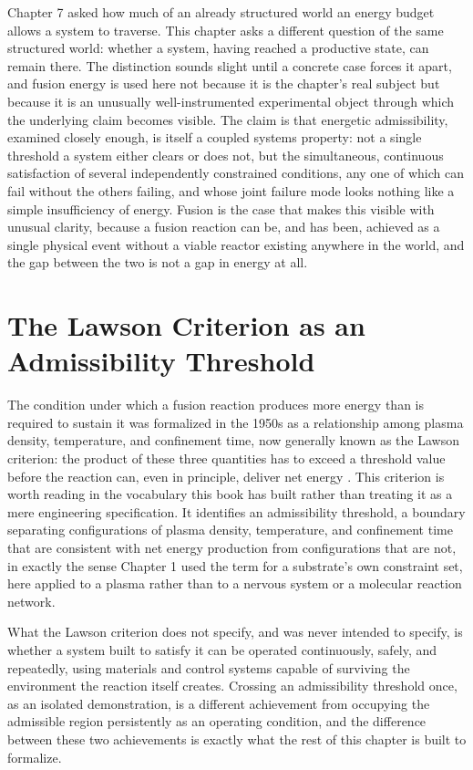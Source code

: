 \documentclass[11pt]{book}
\begin{document}
Chapter 7 asked how much of an already structured world an energy budget allows a system to traverse. This chapter asks a different question of the same structured world: whether a system, having reached a productive state, can remain there. The distinction sounds slight until a concrete case forces it apart, and fusion energy is used here not because it is the chapter's real subject but because it is an unusually well-instrumented experimental object through which the underlying claim becomes visible. The claim is that energetic admissibility, examined closely enough, is itself a coupled systems property: not a single threshold a system either clears or does not, but the simultaneous, continuous satisfaction of several independently constrained conditions, any one of which can fail without the others failing, and whose joint failure mode looks nothing like a simple insufficiency of energy. Fusion is the case that makes this visible with unusual clarity, because a fusion reaction can be, and has been, achieved as a single physical event without a viable reactor existing anywhere in the world, and the gap between the two is not a gap in energy at all.

\section{The Lawson Criterion as an Admissibility Threshold}

The condition under which a fusion reaction produces more energy than is required to sustain it was formalized in the 1950s as a relationship among plasma density, temperature, and confinement time, now generally known as the Lawson criterion: the product of these three quantities has to exceed a threshold value before the reaction can, even in principle, deliver net energy \cite{lawson1957}. This criterion is worth reading in the vocabulary this book has built rather than treating it as a mere engineering specification. It identifies an admissibility threshold, a boundary separating configurations of plasma density, temperature, and confinement time that are consistent with net energy production from configurations that are not, in exactly the sense Chapter 1 used the term for a substrate's own constraint set, here applied to a plasma rather than to a nervous system or a molecular reaction network.

What the Lawson criterion does not specify, and was never intended to specify, is whether a system built to satisfy it can be operated continuously, safely, and repeatedly, using materials and control systems capable of surviving the environment the reaction itself creates. Crossing an admissibility threshold once, as an isolated demonstration, is a different achievement from occupying the admissible region persistently as an operating condition, and the difference between these two achievements is exactly what the rest of this chapter is built to formalize.
\end{document}
